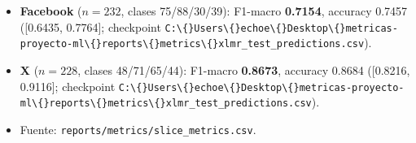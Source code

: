 \begin{itemize}[leftmargin=*]
  \item \textbf{Facebook} ($n=232$, clases 75/88/30/39): F1-macro \textbf{0.7154}, accuracy 0.7457 ([0.6435, 0.7764]; checkpoint \texttt{C:\textbackslash\{\}Users\textbackslash\{\}echoe\textbackslash\{\}Desktop\textbackslash\{\}metricas-proyecto-ml\textbackslash\{\}reports\textbackslash\{\}metrics\textbackslash\{\}xlmr\_test\_predictions.csv}).
  \item \textbf{X} ($n=228$, clases 48/71/65/44): F1-macro \textbf{0.8673}, accuracy 0.8684 ([0.8216, 0.9116]; checkpoint \texttt{C:\textbackslash\{\}Users\textbackslash\{\}echoe\textbackslash\{\}Desktop\textbackslash\{\}metricas-proyecto-ml\textbackslash\{\}reports\textbackslash\{\}metrics\textbackslash\{\}xlmr\_test\_predictions.csv}).
  \item Fuente: \texttt{reports/metrics/slice\_metrics.csv}.
\end{itemize}
